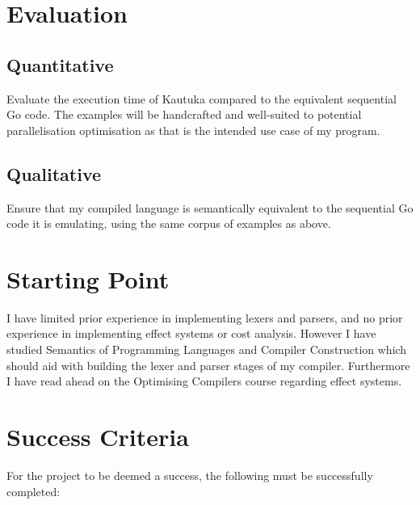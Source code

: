\documentclass[12pt,a4paper,twoside]{article}
\begin{document}
\section{Evaluation}

\subsection*{Quantitative}
Evaluate the execution time of Kautuka compared to the equivalent sequential Go code. The examples will be handcrafted and well-suited to potential parallelisation optimisation as that is the intended use case of my program.

\subsection*{Qualitative}
Ensure that my compiled language is semantically equivalent to the sequential Go code it is emulating, using the same corpus of examples as above.

\section{Starting Point}

I have limited prior experience in implementing lexers and parsers, and no prior experience in implementing effect systems or cost analysis. However I have studied Semantics of Programming Languages and Compiler Construction which should aid with building the lexer and parser stages of my compiler. Furthermore I have read ahead on the Optimising Compilers course regarding effect systems.

\section{Success Criteria}

For the project to be deemed a success, the following must be successfully completed:
\end{document}
